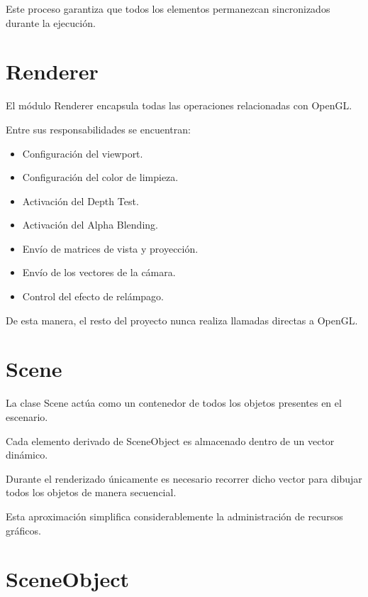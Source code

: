 Este proceso garantiza que todos los elementos permanezcan sincronizados durante la ejecución.

\section{Renderer}

El módulo Renderer encapsula todas las operaciones relacionadas con OpenGL.

Entre sus responsabilidades se encuentran:

\begin{itemize}

\item Configuración del viewport.

\item Configuración del color de limpieza.

\item Activación del Depth Test.

\item Activación del Alpha Blending.

\item Envío de matrices de vista y proyección.

\item Envío de los vectores de la cámara.

\item Control del efecto de relámpago.

\end{itemize}

De esta manera, el resto del proyecto nunca realiza llamadas directas a OpenGL.

\section{Scene}

La clase Scene actúa como un contenedor de todos los objetos presentes en el escenario.

Cada elemento derivado de SceneObject es almacenado dentro de un vector dinámico.

Durante el renderizado únicamente es necesario recorrer dicho vector para dibujar todos los objetos de manera secuencial.

Esta aproximación simplifica considerablemente la administración de recursos gráficos.

\section{SceneObject}

